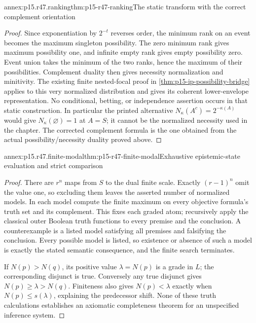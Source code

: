 \begin{annexitem}{annex:p15.r47.ranking}{thm:p15-r47-ranking}{The static transform with the correct complement orientation}
\begin{proof}
Since exponentiation by \(2^{-t}\) reverses order, the minimum rank on
an event becomes the maximum singleton possibility. The zero minimum
rank gives maximum possibility one, and infinite empty rank gives empty
possibility zero. Event union takes the minimum of the two ranks, hence
the maximum of their possibilities. Complement duality then gives
necessity normalization and minitivity. The existing finite nested-focal
proof in \cref{thm:p15-ip-possibility-bridge} applies to this very normalized
distribution and gives its coherent lower-envelope representation.
No conditional, betting, or independence assertion occurs in that static
construction. In particular the printed alternative
\(N_\kappa(A^c)=2^{-\kappa(A)}\) would give \(N_\kappa(\varnothing)=1\)
at \(A=S\); it cannot be the normalized necessity used in the chapter.
The corrected complement formula is the one obtained from the actual
possibility/necessity duality proved above.
\end{proof}\end{annexitem}

\begin{annexitem}{annex:p15.r47.finite-modal}{thm:p15-r47-finite-modal}{Exhaustive epistemic-state evaluation and strict comparison}
\begin{proof}
There are \(r^n\) maps from \(S\) to the dual finite scale. Exactly
\((r-1)^n\) omit the value one, so excluding them leaves the asserted
number of normalized models. In each model compute the finite maximum
on every objective formula's truth set and its complement. This fixes
each graded atom; recursively apply the classical outer Boolean truth
functions to every premise and the conclusion. A counterexample is a
listed model satisfying all premises and falsifying the conclusion.
Every possible model is listed, so existence or absence of such a model
is exactly the stated semantic consequence, and the finite search terminates.

If \(N(p)>N(q)\), its positive value \(\lambda=N(p)\) is a grade in
\(L\); the corresponding disjunct is true. Conversely any true disjunct
gives \(N(p)\geq\lambda>N(q)\). Finiteness also gives
\(N(p)<\lambda\) exactly when \(N(p)\leq s(\lambda)\), explaining
the predecessor shift. None of these truth calculations establishes an
axiomatic completeness theorem for an unspecified inference system.
\end{proof}\end{annexitem}


